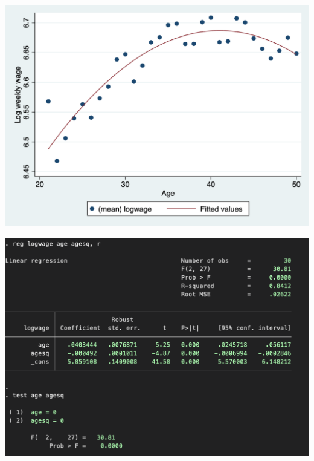 \documentclass[11pt,english,handout]{beamer}
\begin{document}
\begin{frame}
	\includegraphics[width = 0.7\linewidth]{logwages-quadratic}
\end{frame}

\begin{frame}
	\includegraphics[width = 0.7\linewidth]{f-test}
\end{frame}


	
\end{document}
